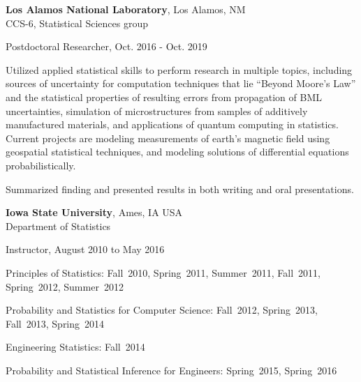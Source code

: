 \documentclass[11pt]{article}
\newenvironment{outerlist}[1][\enskip\textbullet]%
        {\begin{itemize}[#1]}{\end{itemize}%
         \vspace{-.6\baselineskip}}
\newenvironment{innerlist}[1][\enskip\textbullet]%
        {\begin{compactitem}[#1]}{\end{compactitem}}
\begin{document}
\textbf{Los Alamos National Laboratory}, Los Alamos, NM\\
CCS-6, Statistical Sciences group 
	\begin{outerlist}
		 \item[] Postdoctoral Researcher, Oct. 2016 - Oct. 2019
		 \begin{innerlist}
	\item Utilized applied statistical skills to perform research in multiple topics, including sources of uncertainty for computation techniques that lie ``Beyond Moore’s Law'' and the statistical properties of resulting errors from propagation of BML uncertainties, simulation of microstructures from samples of additively manufactured materials, and applications of quantum computing in statistics. Current projects are modeling measurements of earth's magnetic field using geospatial statistical techniques, and modeling solutions of differential equations probabilistically.
	\item Summarized finding and presented results in both writing and oral presentations.
		\end{innerlist}
	\end{outerlist}
\vspace{0.1in}

\textbf{Iowa State University}, Ames, IA USA\\
Department of Statistics 

\begin{outerlist}
\item[] Instructor, August 2010 to May 2016

      \begin{innerlist}
        \item Principles of Statistics: Fall~2010, Spring~2011, Summer~2011, Fall~2011, Spring~2012, Summer~2012
        \item Probability and Statistics for Computer Science: Fall~2012, Spring~2013, Fall~2013, Spring~2014
        \item Engineering Statistics: Fall~2014
        \item Probability and Statistical Inference for Engineers: Spring~2015, Spring~2016
       \end{innerlist}
\end{outerlist}
\end{document}
